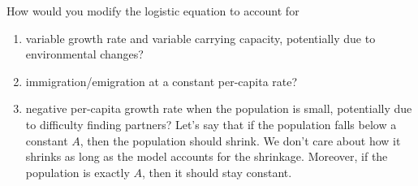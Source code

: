 \documentclass[../main.tex]{subfiles}
\begin{document}
How would you modify the logistic equation to account for
\begin{enumerate}[wide]
  \item variable growth rate and variable carrying capacity, potentially due to environmental changes?
    

  \item immigration/emigration at a constant per-capita rate?


  \item negative per-capita growth rate when the population is small, potentially due to difficulty finding partners?   Let's say that if the population falls below a constant \(A\), then the population should shrink. We don't care about how it shrinks as long as the model accounts for the shrinkage. Moreover, if the population is exactly \(A\), then it should stay constant.

\end{enumerate}
\end{document}
